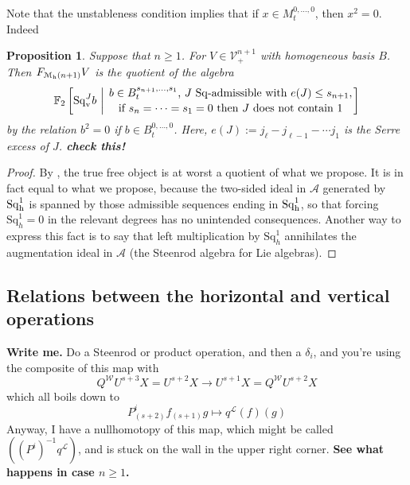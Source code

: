 \documentclass[11pt]{amsart}
\theoremstyle{plain}
\newtheorem{prop}[thm]{Proposition}
\theoremstyle{definition}
\renewcommand{\to}{\longrightarrow}
\newcommand{\calW}{\mathcal{W}}
\newcommand{\calA}{\mathcal{A}}
\newcommand{\calL}{\mathcal{L}}
\newcommand{\calV}{\mathcal{V}}
\newcommand{\calM}{\mathcal{M}}
\theoremstyle{plain}
\newcommand{\vect}[2]{\calV^{#1}_{#2}}
\newcommand{\excess}{e}
\newcommand{\Sq}{\mathrm{Sq}}
\newcommand{\LieSteen}{\calA}
\newcommand{\F}{\mathbb{F}}
\begin{document}
\begin{Cohomology operations for all unstable Lie algebras}
Note that the unstableness condition implies that if $x\in M_t^{0,\ldots,0}$, then $x^2=0$. Indeed
\begin{prop}\label{basis of free horizontal operations algebra}
Suppose that $n\geq1$. For $V\in\vect{n+1}{+}$ with homogeneous basis $B$. Then $F_{\calM_\textup{h}(n+1)}V$ is the quotient of the algebra
\[\F_2\left[\Sq^J_{\textup{v}}b\ \middle|\ \genfrac{}{}{0pt}{}{b\in B^{s_{n+1},\ldots,s_1}_t\textup{, $J$ $\Sq$-admissible with }\excess(J)\leq s_{n+1},}{\textup{if }s_{n}=\cdots=s_1=0\textup{ then $J$ does not contain 1}}\right]\]
by the relation $b^2=0$ if $b\in B_t^{0,\ldots,0}$. Here, $e(J):=j_\ell-j_{\ell-1}-\cdots j_1$ is the Serre excess of $J$. \textbf{{check this!}}
\end{prop}
\begin{proof}
By \cite[6.1]{PriddySimplicialLie.pdf}, the true free object is at worst a quotient of what we propose. It is in fact equal to what we propose, because the two-sided ideal in $\LieSteen$ generated by $\Sq^1_\textup{h}$ is spanned by those admissible sequences ending in $\Sq^1_\textup{h}$, so that forcing $\Sq^1_h=0$ in the relevant degrees has no unintended consequences. Another way to express this fact is to say that left multiplication by $\Sq^1_h$ annihilates the augmentation ideal in $\LieSteen$ (the Steenrod algebra for Lie algebras).
\end{proof}

\subsection{Relations between the horizontal and vertical operations}
\textbf{Write me.} Do a Steenrod or product operation, and then a $\delta_i$, and you're using the composite of this map with
\[Q^\calW U^{s+3}X=U^{s+2}X\to U^{s+1}X=Q^\calW U^{s+2}X\]
which all boils down to
\[P^i_{(s+2)}f_{(s+1)}g\mapsto q^{\calL}(f)(g)\]
Anyway, I have a nullhomotopy of this map, which might be called $((P^i)^{-1}q^{\calL})$, and is stuck on the wall in the upper right corner. \textbf{See what happens in case $n\geq1$.}


\end{Cohomology operations for all unstable Lie algebras}
\end{document}
